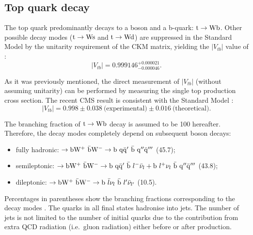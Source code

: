 

\subsection{Top quark decay}
\label{ss:top_decay}
The top quark predominantly decays to a \W boson and a b-quark: $\mathrm{t} \rightarrow \mathrm{W} \mathrm{b}$. Other possible decay modes
($\mathrm{t} \rightarrow \mathrm{W} \mathrm{s}$ and $\mathrm{t} \rightarrow \mathrm{W} \mathrm{d}$) are suppressed in the Standard Model by the unitarity
requirement of the CKM matrix, yielding the $|V_{tb}|$ value of \autocite{PDG}:
\begin{equation}
|V_{tb}| = 0.999146^{+0.000021}_{-0.000046}.
\end{equation}

As it was previously mentioned, the direct measurement of $|V_{tb}|$ (without assuming unitarity) can be performed by
measuring the single top production cross section. The recent CMS result is consistent with the Standard
Model \autocite{single_top_Vtb_CMS}:
\begin{equation}
|V_{tb}| = 0.998 \pm 0.038~\textrm{(experimental)} \pm 0.016~\textrm{(theoretical)}.
\end{equation}

The branching fraction of $\mathrm{t} \rightarrow \mathrm{W} \mathrm{b}$ decay is assumed to be \SI{100}{\pc} hereafter. Therefore, the
\ttbar decay modes completely depend on subsequent \W boson decays:
\begin{itemize}
  \item fully hadronic: \ttbar $\rightarrow \mathrm{b} \mathrm{W}^+ ~ \bar{\mathrm{b}} \mathrm{W}^- \rightarrow  \mathrm{b}~\mathrm{q}\bar{\mathrm{q}}' ~
  \bar{\mathrm{b}}~\mathrm{q}'' \bar{\mathrm{q}}'''$ (\SI{45.7}{\pc});
  \item semileptonic: \ttbar $\rightarrow \mathrm{b} \mathrm{W}^+ ~ \bar{\mathrm{b}} \mathrm{W}^- \rightarrow \mathrm{b}~\mathrm{q}\bar{\mathrm{q}}' ~ \bar{\mathrm{b}}
  ~ l^- \bar{\nu}_l + \mathrm{b}~l^+ \nu_l ~ \bar{\mathrm{b}}~\mathrm{q}'' \bar{\mathrm{q}}'''$ (\SI{43.8}{\pc});
  \item dileptonic: \ttbar $\rightarrow \mathrm{b} \mathrm{W}^+ ~ \bar{\mathrm{b}} \mathrm{W}^- \rightarrow  \mathrm{b}~\bar{l} \nu_l ~ \bar{\mathrm{b}} ~
  l'\bar{\nu}_{l'}$ (\SI{10.5}{\pc}).
\end{itemize}

Percentages in parentheses show the branching fractions corresponding to the decay modes \autocite{PDG}. The quarks in
all final states hadronise into jets. The number of jets is not limited to the number of initial quarks due to the
contribution from extra QCD radiation (i.e.\ gluon radiation) either before or after \ttbar production.


